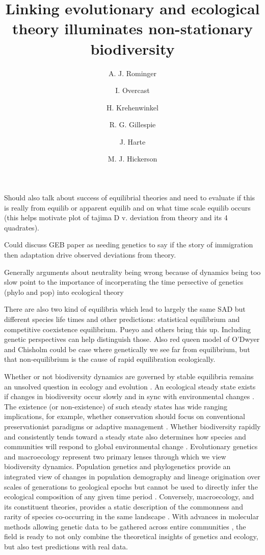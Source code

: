 \documentclass[12pt]{article}
\title{Linking evolutionary and ecological theory illuminates
  non-stationary biodiversity}
\author[1]{A. J. Rominger}
\author[2]{I. Overcast}
\author[1]{H. Krehenwinkel}
\author[1]{R. G. Gillespie}
\author[1]{J. Harte}
\author[2]{M. J. Hickerson}
\affil[1]{Department of Environmental Science, Policy and Management,
  University of California, Berkeley}
\affil[2]{Biology Department, City College of New York}
\date{}
\begin{document}
\maketitle

Should also talk about success of equilibrial theories and need to
evaluate if this is really from equilib or apparent equilib and on
what time scale equilib occurs (this helps motivate plot of tajima D
v. deviation from theory and its 4 quadrates).

Could discuss GEB paper as needing genetics to say if the story of
immigration then adaptation drive observed deviations from theory.

Generally arguments about neutrality being wrong because of dynamics
being too slow point to the importance of incorperating the time
persective of genetics (phylo and pop) into ecological theory

There are also two kind of equilibria which lead to largely the same
SAD but different species life times and other predictions:
statistical equilibrium and competitive coexistence equilibrium. Pueyo
and others bring this up.  Including genetic perspectives can help
distinguish those.  Also red queen model of O'Dwyer and Chisholm could
be case where genetically we see far from equilibrium, but that
non-equilibrium is the cause of rapid equilibration ecologically.

Whether or not biodiversity dynamics are governed by stable equilibria
remains an unsolved question in ecology and evolution
\citep{quental2013, rabosky2015amNat, harmon2015amNat}. An ecological
steady state exists if changes in biodiversity occur slowly and in
sync with environmental changes \citep{harteNewman}. The existence (or
non-existence) of such steady states has wide ranging implications,
for example, whether conservation should focus on conventional
preservationist paradigms or adaptive management \citep{levin1999}.
Whether biodiversity rapidly and consistently tends toward a steady
state also determines how species and communities will respond to
global environmental change \citep{barnosky2012}. Evolutionary
genetics \citep{nielsen2005, nei2010} and macroecology
\citep{brown1995} represent two primary lenses through which we view
biodiversity dynamics. Population genetics and phylogenetics provide
an integrated view of changes in population demography and lineage
origination over scales of generations to geological epochs but cannot
be used to directly infer the ecological composition of any given time
period \citep{quental2010}. Conversely, macroecology, and its
constituent theories, provides a static description of the commonness
and rarity of species co-occurring in the same landscape
\citep{hubbell2001, harteNewman}.  With advances in molecular methods
\citep{mccormack2013} allowing genetic data to be gathered across
entire communities \citep{gibson2014}, the field is
ready to not only combine the theoretical insights of genetics and
ecology, but also test predictions with real data.
\end{document}
